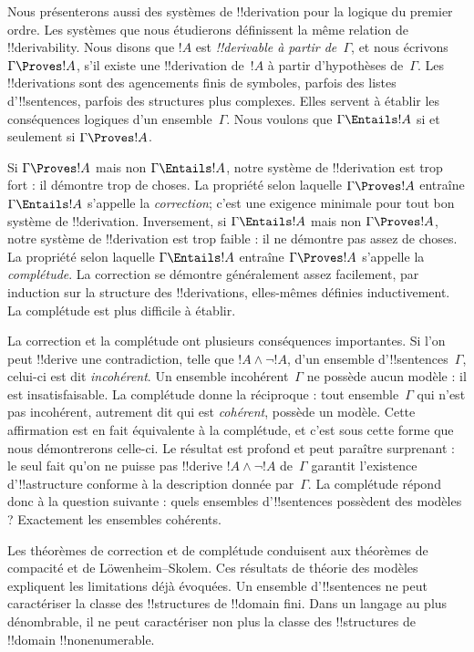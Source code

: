 \documentclass[../../../include/open-logic-section]{subfiles}
\begin{document}


Nous présenterons aussi des systèmes de !!{derivation} pour la logique
du premier ordre. Les systèmes que nous étudierons définissent la
même relation de !!{derivability}. Nous disons que $!A$ est
\emph{!!{derivable} à partir de~$\Gamma$}, et nous écrivons
$\Gamma \Proves !A$, s'il existe une !!{derivation} de~$!A$ à
partir d'hypothèses de~$\Gamma$. Les !!{derivation}s sont des
agencements finis de symboles, parfois des listes d'!!{sentence}s,
parfois des structures plus complexes. Elles servent à établir
les conséquences logiques d'un ensemble~$\Gamma$. Nous voulons que
$\Gamma \Entails !A$ si et seulement si $\Gamma \Proves !A$.

Si $\Gamma \Proves !A$ mais non $\Gamma \Entails !A$, notre système de
!!{derivation} est trop fort : il démontre trop de choses. La propriété
selon laquelle $\Gamma \Proves !A$ entraîne
$\Gamma \Entails !A$ s'appelle la \emph{correction}; c'est une exigence
minimale pour tout bon système de !!{derivation}. Inversement, si
$\Gamma \Entails !A$ mais non $\Gamma \Proves !A$, notre système de
!!{derivation} est trop faible : il ne démontre pas assez de choses. La
propriété selon laquelle $\Gamma \Entails !A$ entraîne
$\Gamma \Proves !A$ s'appelle la \emph{complétude}. La correction se
démontre généralement assez facilement, par induction sur la structure
des !!{derivation}s, elles-mêmes définies inductivement. La complétude
est plus difficile à établir.

La correction et la complétude ont plusieurs conséquences importantes.
Si l'on peut !!{derive} une contradiction, telle que
$!A \land \lnot !A$, d'un ensemble d'!!{sentence}s~$\Gamma$, celui-ci
est dit \emph{incohérent}. Un ensemble incohérent~$\Gamma$ ne possède
aucun modèle : il est insatisfaisable. La complétude donne la réciproque :
tout ensemble~$\Gamma$ qui n'est pas incohérent, autrement dit qui est
\emph{cohérent}, possède un modèle. Cette affirmation est en fait
équivalente à la complétude, et c'est sous cette forme que nous
démontrerons celle-ci. Le résultat est profond et peut paraître
surprenant : le seul fait qu'on ne puisse pas !!{derive}
$!A \land \lnot !A$ de~$\Gamma$ garantit l'existence
d'!!a{structure} conforme à la description donnée par~$\Gamma$. La
complétude répond donc à la question suivante : quels ensembles
d'!!{sentence}s possèdent des modèles ? Exactement les ensembles
cohérents.

Les théorèmes de correction et de complétude conduisent aux théorèmes
de compacité et de L\"owenheim--Skolem. Ces résultats de théorie des
modèles expliquent les limitations déjà évoquées. Un ensemble
d'!!{sentence}s ne peut caractériser la classe des !!{structure}s de
!!{domain} fini. Dans un langage au plus dénombrable, il ne peut
caractériser non plus la classe des !!{structure}s de !!{domain}
!!{nonenumerable}.
\end{document}
